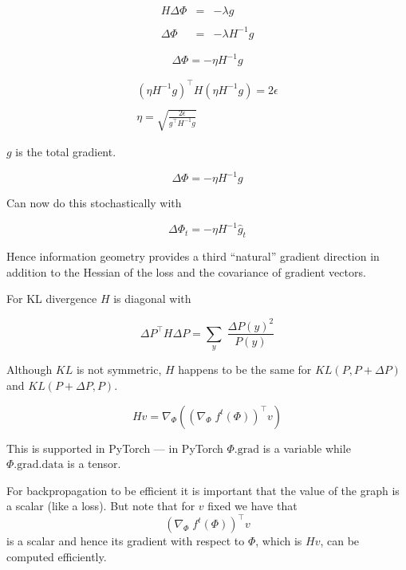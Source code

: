 {\begin{eqnarray*}
H\Delta \Phi & = & - \lambda g \\
\\
\Delta \Phi & = & - \lambda H^{-1} g
\end{eqnarray*}


$$\Delta \Phi = - \eta H^{-1} g$$

\begin{eqnarray*}
(\eta H^{-1} g)^\top H (\eta H^{-1}g) = 2 \epsilon \\
\\
\eta = \sqrt{\frac{2\epsilon}{g^\top H^{-1} g}}
\end{eqnarray*}

\vfill
$g$ is the total gradient.


$$\Delta \Phi = - \eta H^{-1} g$$

\vfill
Can now do this stochastically with

$$\Delta \Phi_t = - \eta H^{-1} \hat{g}_t$$

\vfill
Hence information geometry provides a third ``natural'' gradient direction in addition to the Hessian of the loss and the covariance of gradient vectors.


\vfill
For KL divergence $H$ is diagonal with

$$\Delta P^\top H \Delta P = \sum_{y} \; \frac{\Delta P(y)^2}{P(y)}$$

\vfill
Although $KL$ is not symmetric, $H$ happens to be the same for $KL(P,P+\Delta P)$ and $KL(P+\Delta P,P)$.



$$H v = \nabla_\Phi \left((\nabla_\Phi\; f^t(\Phi))^\top v\right)$$

\vfill
This is supported in PyTorch --- in PyTorch $\Phi.\mathrm{grad}$ is a variable while $\Phi.\mathrm{grad}.\mathrm{data}$ is a tensor.

For backpropagation to be efficient it is important that the value of the graph is a scalar (like a loss).  But note that for $v$ fixed we have that
$$(\nabla_\Phi\; f^t(\Phi))^\top v$$
is a scalar and hence its gradient with respect to $\Phi$, which is $Hv$, can be computed efficiently.


}
